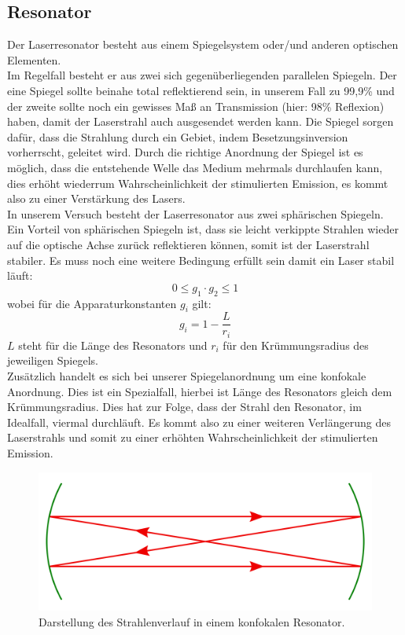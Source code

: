 \subsection{Resonator}
Der Laserresonator besteht aus einem Spiegelsystem oder/und anderen optischen Elementen.\\
Im Regelfall besteht er aus zwei sich gegenüberliegenden parallelen Spiegeln. Der eine Spiegel sollte 
beinahe total reflektierend sein, in unserem Fall zu 99,9\% und der zweite sollte noch 
ein gewisses Maß an Transmission (hier: 98\% Reflexion) haben, damit der Laserstrahl auch ausgesendet werden kann.
Die Spiegel sorgen dafür, dass die Strahlung durch ein Gebiet, indem Besetzungsinversion vorherrscht, geleitet wird. 
Durch die richtige Anordnung der Spiegel ist es möglich, dass die entstehende Welle das Medium mehrmals durchlaufen kann, dies erhöht wiederrum
Wahrscheinlichkeit der stimulierten Emission, es kommt also zu einer Verstärkung des Lasers. \citep[vgl.][]{laser1}\\
In unserem Versuch besteht der Laserresonator aus zwei sphärischen Spiegeln. Ein Vorteil von sphärischen Spiegeln ist, 
dass sie leicht verkippte Strahlen wieder auf die optische Achse zurück reflektieren können, somit ist der Laserstrahl stabiler. Es muss noch eine weitere Bedingung erfüllt sein damit ein Laser stabil läuft:
\begin{equation}
    0 \leq g_1 \cdot g_2 \leq 1
\end{equation} 
wobei für die Apparaturkonstanten $g_i$ gilt:
\begin{equation}
    g_i = 1 - \frac{L}{r_i}
\end{equation}
$L$ steht für die Länge des Resonators und $r_i$ für den Krümmungsradius des jeweiligen Spiegels. \\
Zusätzlich handelt es sich bei unserer Spiegelanordnung um eine konfokale Anordnung. 
Dies ist ein Spezialfall, hierbei ist Länge des Resonators gleich dem Krümmungsradius. 
Dies hat zur Folge, dass der Strahl den Resonator, im Idealfall, viermal durchläuft. 
Es kommt also zu einer weiteren Verlängerung des Laserstrahls und somit zu einer erhöhten Wahrscheinlichkeit der stimulierten Emission. \citep[vgl.][]{laser}
\begin{figure}[h]
    \centering
    \includegraphics[scale=0.13]{Bilder/FzV/konfokale.png}
    \caption{Darstellung des Strahlenverlauf in einem konfokalen Resonator.}
\end{figure}


